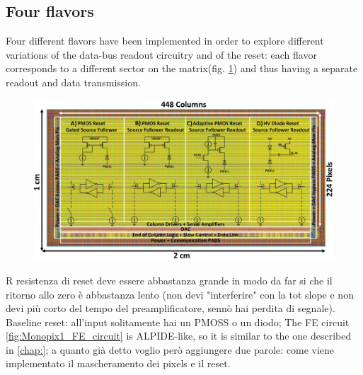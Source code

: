     \subsection{Four flavors}
        Four different flavors have been implemented in order to explore different variations of the data-bus readout circuitry and of the reset: each flavor corresponds to a different sector on the matrix(fig. \ref{fig:Monopix1_flavors}) and thus having a separate readout and data transmission. 
        \begin{figure}[h!]
            \centering
            \includegraphics[width=.8\linewidth]{figures/Monopix1/Monopix1_flavors.png}
            \caption{}
            \label{fig:Monopix1_flavors}
        \end{figure}
        R resistenza di reset deve essere abbastanza grande in modo da far si che il ritorno allo zero è abbastanza lento (non devi "interferire" con la tot slope e non devi più corto del tempo del preamplificatore, sennò hai perdita di segnale).\\
        Baseline reset: all'input solitamente hai un PMOSS o un diodo;  
        The FE circuit \ref{fig:Monopix1_FE_circuit} is ALPIDE-like, so it is similar to the one described in \ref{chap:}; a quanto già detto voglio però aggiungere due parole: come viene implementato il mascheramento dei pixels e il reset.\\ 

